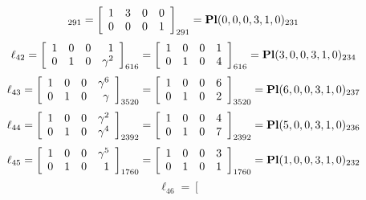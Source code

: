 \documentclass{article}
\begin{document}
{$$_{291}
=
\left[
\begin{array}{*{4}c}
1  & 3  & 0  & 0\\
0  & 0  & 0  & 1\\
\end{array}
\right]_{291}
={\rm\bf Pl}(0,0,0,3,1,0 )_{231}$$
$$
\ell_{42} = 
\left[
\begin{array}{*{4}{r}}
1 & 0 & 0 & 1\\
0 & 1 & 0 & \gamma^{2}\\
\end{array}
\right]
_{616}
=
\left[
\begin{array}{*{4}c}
1  & 0  & 0  & 1\\
0  & 1  & 0  & 4\\
\end{array}
\right]_{616}
={\rm\bf Pl}(3,0,0,3,1,0 )_{234}$$
$$
\ell_{43} = 
\left[
\begin{array}{*{4}{r}}
1 & 0 & 0 & \gamma^{6}\\
0 & 1 & 0 & \gamma \\
\end{array}
\right]
_{3520}
=
\left[
\begin{array}{*{4}c}
1  & 0  & 0  & 6\\
0  & 1  & 0  & 2\\
\end{array}
\right]_{3520}
={\rm\bf Pl}(6,0,0,3,1,0 )_{237}$$
$$
\ell_{44} = 
\left[
\begin{array}{*{4}{r}}
1 & 0 & 0 & \gamma^{2}\\
0 & 1 & 0 & \gamma^{4}\\
\end{array}
\right]
_{2392}
=
\left[
\begin{array}{*{4}c}
1  & 0  & 0  & 4\\
0  & 1  & 0  & 7\\
\end{array}
\right]_{2392}
={\rm\bf Pl}(5,0,0,3,1,0 )_{236}$$
$$
\ell_{45} = 
\left[
\begin{array}{*{4}{r}}
1 & 0 & 0 & \gamma^{5}\\
0 & 1 & 0 & 1\\
\end{array}
\right]
_{1760}
=
\left[
\begin{array}{*{4}c}
1  & 0  & 0  & 3\\
0  & 1  & 0  & 1\\
\end{array}
\right]_{1760}
={\rm\bf Pl}(1,0,0,3,1,0 )_{232}$$
$$
\ell_{46} = 
\left[
\begin{array}{*{4}{r}}

\end{array}$$}
\end{document}
